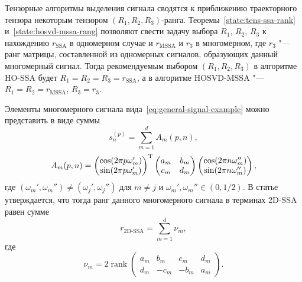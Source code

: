 \documentclass[specialist,
    substylefile = spbu.rtx,
    subf,href,colorlinks=true, 12pt]{disser}
\theoremstyle{plain}
\theoremstyle{definition}
\theoremstyle{remark}
\begin{document}
    Тензорные алгоритмы выделения сигнала сводятся к приближению траекторного тензора некоторым
    тензором $(R_1, R_2, R_3)$-ранга.
    Теоремы~\ref{state:tens-ssa-rank} и~\ref{state:hosvd-mssa-rang} позволяют свести задачу выбора $R_1$,
    $R_2$, $R_3$ к нахождению $r_{\text{SSA}}$ в одномерном случае и $r_\text{MSSA}$ и $r_3$ в многомерном,
    где $r_3$ "--- ранг матрицы, составленной из одномерных сигналов, образующих данный многомерный сигнал.
    Тогда рекомендуемым выбором $(R_1, R_2, R_3)$ в алгоритме HO-SSA будет $R_1=R_2=R_3=r_\text{SSA}$, а
    в алгоритме HOSVD-MSSA "--- $R_1=R_2=r_\text{MSSA}$, $R_3 = r_3$.
    
    Элементы многомерного сигнала вида~\eqref{eq:general-signal-example} можно
    представить в виде суммы
    \[
        s^{(p)}_n = \sum_{m=1}^{d} A_m(p, n),
    \]
    \[
        A_m(p, n) =
        \begin{pmatrix}
            \cos(2\pi p\omega_m') \\
            \sin(2\pi p\omega_m')
        \end{pmatrix}^{\mathrm{T}}
        \begin{pmatrix}
            a_m & b_m \\
            c_m & d_m
        \end{pmatrix}
        \begin{pmatrix}
            \cos(2\pi n\omega_m'') \\
            \sin(2\pi n\omega_m'')
        \end{pmatrix},
    \]
    где $(\omega_m', \omega_m'') \ne (\omega_j', \omega_j'')$ для $m\ne j$ и $\omega_m', \omega_m'' \in (0, 1/2)$.
    В статье~\cite{2d-ssa} утверждается, что тогда ранг данного многомерного сигнала в терминах 
    2D-SSA равен сумме
    \[
        r_\text{2D-SSA} = \sum_{m=1}^{d} \nu_m,
    \]
    где
    \[
        \nu_m = 2\operatorname{rank}\begin{pmatrix}
            a_m & b_m  & c_m  & d_m \\
            d_m & -c_m & -b_m & a_m
        \end{pmatrix}.
    \]
\end{document}
